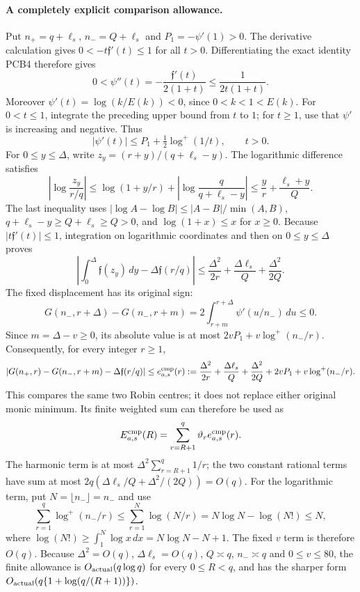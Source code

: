 \paragraph{A completely explicit comparison allowance.}
Put $n_+=q+\ell_s$, $n_-=Q+\ell_s$ and
$P_1=-\psi'(1)>0$. The derivative calculation gives
$0<-t\mathfrak f'(t)\le1$ for all $t>0$.
Differentiating the exact identity PCB4 therefore gives
\[
 0<\psi''(t)=-\frac{\mathfrak f'(t)}{2(1+t)}
       \le\frac1{2t(1+t)}.
\]
Moreover $\psi'(t)=\log(k/E(k))<0$, since $0<k<1<E(k)$.
For $0<t\le1$, integrate the preceding upper bound from $t$ to $1$;
for $t\ge1$, use that $\psi'$ is increasing and negative. Thus
\[
 |\psi'(t)|\le P_1+\tfrac12\log^+(1/t),\qquad t>0.
\]
For $0\le y\le\Delta$, write
$z_y=(r+y)/(q+\ell_s-y)$. The logarithmic difference satisfies
\[
 \left|\log\frac{z_y}{r/q}\right|
 \le\log(1+y/r)+
      \left|\log\frac q{q+\ell_s-y}\right|
 \le\frac yr+\frac{\ell_s+y}{Q}.
\]
The last inequality uses
$|\log A-\log B|\le|A-B|/\min(A,B)$,
$q+\ell_s-y\ge Q+\ell_s\ge Q>0$, and
$\log(1+x)\le x$ for $x\ge0$.
Because $|t\mathfrak f'(t)|\le1$, integration on logarithmic coordinates
and then on $0\le y\le\Delta$ proves
\[
 \left|\int_0^\Delta\mathfrak f(z_y)\,dy
                   -\Delta\mathfrak f(r/q)\right|
 \le\frac{\Delta^2}{2r}
       +\frac{\Delta\ell_s}{Q}+\frac{\Delta^2}{2Q}.
\]
The fixed displacement has its original sign:
\[
 G(n_-,r+\Delta)-G(n_-,r+m)
       =2\int_{r+m}^{r+\Delta}\psi'(u/n_-)\,du\le0.
\]
Since $m=\Delta-v\ge0$, its absolute value is at most
$2vP_1+v\log^+(n_-/r)$. Consequently, for every integer $r\ge1$,
\[
 \left|G(n_+,r)-G(n_-,r+m)-\Delta\mathfrak f(r/q)\right|
 \le e^{\rm cmp}_{a,s}(r):=
 \frac{\Delta^2}{2r}+\frac{\Delta\ell_s}{Q}
       +\frac{\Delta^2}{2Q}+2vP_1+v\log^+(n_-/r).
\]
This compares the same two Robin centres; it does not replace either
original monic minimum. Its finite weighted sum can therefore be used as
\[
 E^{\rm cmp}_{a,s}(R)
    =\sum_{r=R+1}^{q}\vartheta_r e^{\rm cmp}_{a,s}(r).
\]
The harmonic term is at most
$\Delta^2\sum_{r=R+1}^{q}1/r$; the two constant rational terms have
sum at most $2q(\Delta\ell_s/Q+\Delta^2/(2Q))=O(q)$.
For the logarithmic term, put $N=\lfloor n_-\rfloor=n_-$ and use
\[
 \sum_{r=1}^{q}\log^+(n_-/r)
 \le\sum_{r=1}^{N}\log(N/r)
       =N\log N-\log(N!)\le N,
\]
where $\log(N!)\ge\int_1^N\log x\,dx=N\log N-N+1$.
The fixed $v$ term is therefore $O(q)$.
Because $\Delta^2=O(q)$, $\Delta\ell_s=O(q)$, $Q\asymp q$,
$n_-\asymp q$ and $0\le v\le80$, the finite allowance is
$O_{\rm actual}(q\log q)$ for every $0\le R<q$,
and has the sharper form $O_{\rm actual}(q\{1+\log(q/(R+1))\})$.


